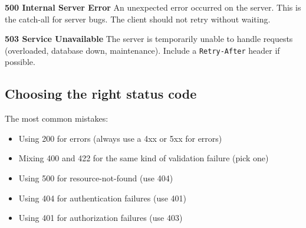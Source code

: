 \noindent{}\textbf{500 Internal Server Error}
An unexpected error occurred on the server. This is the catch-all for server bugs. The client should not retry without waiting.

\begin{codebox}[short]

\begin{Shaded}
\begin{Highlighting}[]
\NormalTok{: }\NormalTok{\}), }
\end{Highlighting}
\end{Shaded}

\end{codebox}

\noindent{}\textbf{503 Service Unavailable}
The server is temporarily unable to handle requests (overloaded, database down, maintenance). Include a \texttt{Retry-After} header if possible.

\begin{codebox}[short]

\begin{Shaded}
\begin{Highlighting}[]
\NormalTok{: }\NormalTok{\}), }
\end{Highlighting}
\end{Shaded}

\end{codebox}

\subsection*{Choosing the right status code}\label{34-response-handling:choosing-the-right-status-code}

The most common mistakes:

\begin{itemize}
\tightlist
\item
  Using 200 for errors (always use a 4xx or 5xx for errors)
\item
  Mixing 400 and 422 for the same kind of validation failure (pick one)
\item
  Using 500 for resource-not-found (use 404)
\item
  Using 404 for authentication failures (use 401)
\item
  Using 401 for authorization failures (use 403)
\end{itemize}

